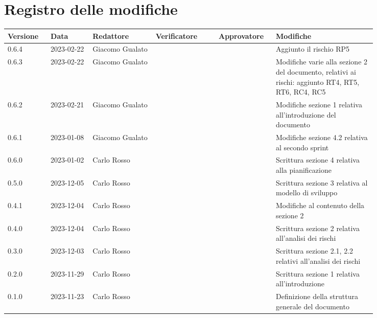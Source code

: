 \section*{Registro delle modifiche}

{
\renewcommand{\arraystretch}{1.5}
\scriptsize
\begin{longtable}{p{0.10\linewidth}p{0.10\linewidth}p{0.15\linewidth}p{0.15\linewidth}p{0.10\linewidth}p{0.24\linewidth}}
	\textbf{Versione} & \textbf{Data} & \textbf{Redattore} & \textbf{Verificatore} & \textbf{Approvatore} & \textbf{Modifiche}	\\
	\toprule
	0.6.4             & 2023-02-22    & Giacomo Gualato    & 	&	& Aggiunto il rischio RP5				\\
	\hline
	0.6.3             & 2023-02-22    & Giacomo Gualato    & 	&	& Modifiche varie alla sezione 2 del documento, relativi ai rischi: 
																	  aggiunto RT4, RT5, RT6, RC4, RC5 						\\
	\hline
	0.6.2             & 2023-02-21    & Giacomo Gualato    & 	&	& Modifiche sezione 1 relativa all'introduzione del documento 		\\
	\hline
	0.6.1             & 2023-01-08    & Giacomo Gualato    & 	&	& Modifiche sezione 4.2 relativa al secondo sprint 		\\
	\hline
	0.6.0             & 2023-01-02    & Carlo Rosso        & 	&	& Scrittura sezione 4 relativa alla pianificazione 		\\
	\hline
	0.5.0             & 2023-12-05    & Carlo Rosso        & 	&	& Scrittura sezione 3 relativa al modello di sviluppo	\\
	\hline
	0.4.1             & 2023-12-04    & Carlo Rosso        & 	&	& Modifiche al contenuto della sezione 2				\\
	\hline
	0.4.0             & 2023-12-04    & Carlo Rosso        & 	&	& Scrittura sezione 2 relativa all'analisi dei rischi	\\
	\hline
	0.3.0             & 2023-12-03    & Carlo Rosso        & 	&	& Scrittura sezione 2.1, 2.2 relativi all'analisi dei rischi	\\
	\hline
	0.2.0             & 2023-11-29    & Carlo Rosso        & 	&	& Scrittura sezione 1 relativa all'introduzione			\\
	\hline
	0.1.0             & 2023-11-23    & Carlo Rosso        & 	&	& Definizione della struttura generale del documento	\\
	\bottomrule
\end{longtable}
}